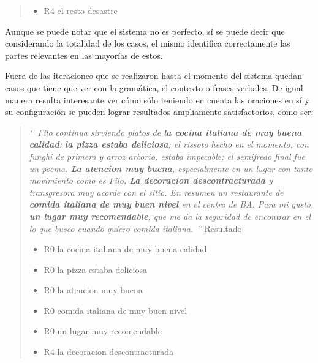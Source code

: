\begin{quotation}
\begin{itemize}
\item R4  el resto desastre
\end{itemize}
\end{quotation}

Aunque se puede notar que el sistema no es perfecto, sí se puede decir que considerando la totalidad de los casos, el mismo identifica correctamente las partes relevantes en las mayorías de estos.

Fuera de las iteraciones que se realizaron hasta el momento del sistema quedan casos que tiene que ver con la gramática, el contexto o frases verbales. De igual manera resulta interesante ver cómo sólo teniendo en cuenta las oraciones en sí y su configuración se pueden lograr resultados ampliamente satisfactorios, como ser:

\begin{quotation}
\emph{
\lq\lq{}
Filo continua sirviendo platos de {\bf la cocina italiana de muy buena calidad}: {\bf la pizza estaba deliciosa}; el rissoto hecho en el momento, con funghi de primera y arroz arborio, estaba  impecable; el semifredo final fue un poema.  {\bf La atencion muy buena}, especialmente en un lugar con tanto movimiento como es Filo, {\bf La decoracion descontracturada} y transgresora muy acorde con el sitio.  En resumen un restaurante de {\bf comida italiana de muy buen nivel} en el centro de BA.  Para mi gusto, {\bf un lugar muy recomendable}, que me da la seguridad de encontrar en el lo que busco cuando quiero comida italiana. 
\rq\rq{}
}
Resultado:
\begin{itemize}
\item R0 la cocina italiana de muy buena calidad
\item R0 la pizza estaba deliciosa
\item R0 la atencion muy buena
\item R0 comida italiana de muy buen nivel
\item R0 un lugar muy recomendable
\item R4  la decoracion descontracturada
\end{itemize}
\end{quotation}


